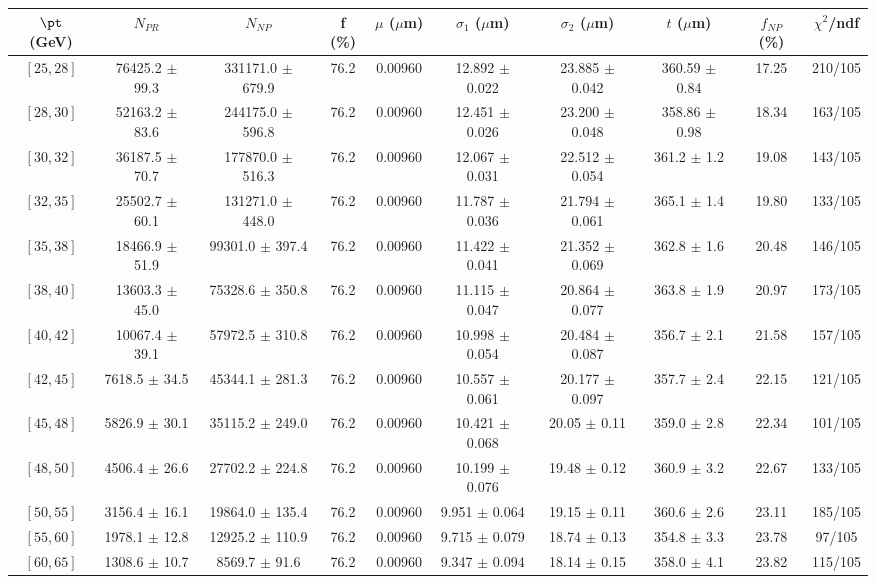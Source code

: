 \begin{tabular}{c||c|c|c|c|c|c|c||c|c}
$\pt$ (GeV) & $N_{PR}$ & $N_{NP}$ & f (\%) & $\mu$ ($\mu$m) & $\sigma_1$ ($\mu$m) & $\sigma_2$ ($\mu$m)  & $t$ ($\mu$m) & $f_{NP}$ (\%) & $\chi^2$/ndf \\
\hline
$[25, 28]$ & 76425.2 $\pm$ 99.3 & 331171.0 $\pm$ 679.9 & 76.2 & 0.00960 & 12.892 $\pm$ 0.022 & 23.885 $\pm$ 0.042 & 360.59 $\pm$ 0.84 & 17.25 & 210/105\\
$[28, 30]$ & 52163.2 $\pm$ 83.6 & 244175.0 $\pm$ 596.8 & 76.2 & 0.00960 & 12.451 $\pm$ 0.026 & 23.200 $\pm$ 0.048 & 358.86 $\pm$ 0.98 & 18.34 & 163/105\\
$[30, 32]$ & 36187.5 $\pm$ 70.7 & 177870.0 $\pm$ 516.3 & 76.2 & 0.00960 & 12.067 $\pm$ 0.031 & 22.512 $\pm$ 0.054 & 361.2 $\pm$ 1.2 & 19.08 & 143/105\\
$[32, 35]$ & 25502.7 $\pm$ 60.1 & 131271.0 $\pm$ 448.0 & 76.2 & 0.00960 & 11.787 $\pm$ 0.036 & 21.794 $\pm$ 0.061 & 365.1 $\pm$ 1.4 & 19.80 & 133/105\\
$[35, 38]$ & 18466.9 $\pm$ 51.9 & 99301.0 $\pm$ 397.4 & 76.2 & 0.00960 & 11.422 $\pm$ 0.041 & 21.352 $\pm$ 0.069 & 362.8 $\pm$ 1.6 & 20.48 & 146/105\\
$[38, 40]$ & 13603.3 $\pm$ 45.0 & 75328.6 $\pm$ 350.8 & 76.2 & 0.00960 & 11.115 $\pm$ 0.047 & 20.864 $\pm$ 0.077 & 363.8 $\pm$ 1.9 & 20.97 & 173/105\\
$[40, 42]$ & 10067.4 $\pm$ 39.1 & 57972.5 $\pm$ 310.8 & 76.2 & 0.00960 & 10.998 $\pm$ 0.054 & 20.484 $\pm$ 0.087 & 356.7 $\pm$ 2.1 & 21.58 & 157/105\\
$[42, 45]$ & 7618.5 $\pm$ 34.5 & 45344.1 $\pm$ 281.3 & 76.2 & 0.00960 & 10.557 $\pm$ 0.061 & 20.177 $\pm$ 0.097 & 357.7 $\pm$ 2.4 & 22.15 & 121/105\\
$[45, 48]$ & 5826.9 $\pm$ 30.1 & 35115.2 $\pm$ 249.0 & 76.2 & 0.00960 & 10.421 $\pm$ 0.068 & 20.05 $\pm$ 0.11 & 359.0 $\pm$ 2.8 & 22.34 & 101/105\\
$[48, 50]$ & 4506.4 $\pm$ 26.6 & 27702.2 $\pm$ 224.8 & 76.2 & 0.00960 & 10.199 $\pm$ 0.076 & 19.48 $\pm$ 0.12 & 360.9 $\pm$ 3.2 & 22.67 & 133/105\\
$[50, 55]$ & 3156.4 $\pm$ 16.1 & 19864.0 $\pm$ 135.4 & 76.2 & 0.00960 & 9.951 $\pm$ 0.064 & 19.15 $\pm$ 0.11 & 360.6 $\pm$ 2.6 & 23.11 & 185/105\\
$[55, 60]$ & 1978.1 $\pm$ 12.8 & 12925.2 $\pm$ 110.9 & 76.2 & 0.00960 & 9.715 $\pm$ 0.079 & 18.74 $\pm$ 0.13 & 354.8 $\pm$ 3.3 & 23.78 & 97/105\\
$[60, 65]$ & 1308.6 $\pm$ 10.7 & 8569.7 $\pm$ 91.6 & 76.2 & 0.00960 & 9.347 $\pm$ 0.094 & 18.14 $\pm$ 0.15 & 358.0 $\pm$ 4.1 & 23.82 & 115/105\\

\end{tabular}
